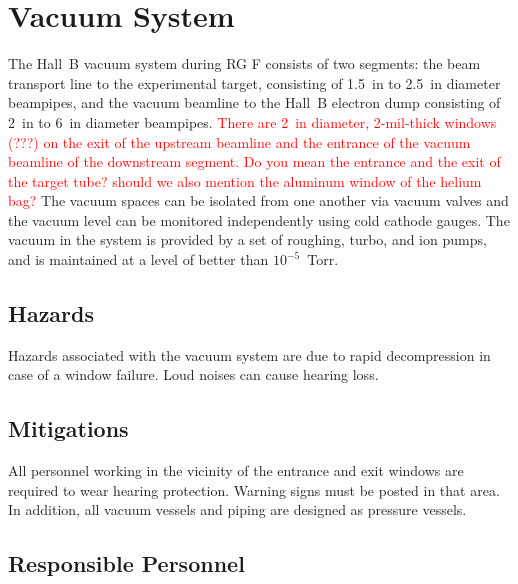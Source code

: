 \section{Vacuum System}

The Hall~B vacuum system during RG F consists of %
two segments: the beam transport line to the 
experimental target, consisting of 1.5~in to 2.5~in diameter beampipes, 
and the vacuum beamline to the Hall~B electron dump consisting of 
2~in to 6~in diameter beampipes. 
\textcolor{red}{There are  2~in diameter, 2-mil-thick windows (???) on the exit 
of the upstream beamline and the entrance of the vacuum beamline of the 
downstream segment. Do you mean the entrance and the exit of the target tube?  
should we also mention the aluminum window of the helium bag?} 
The vacuum spaces can be 
isolated from one another via vacuum valves and the vacuum level can be monitored 
independently using cold cathode gauges. The vacuum in the system is provided by a set of 
roughing, turbo, and ion pumps, and is maintained at a level of better than 
$10^{-5}$~Torr. 

\subsection{Hazards} 

Hazards associated with the vacuum system are due to rapid decompression in case of a window 
failure. Loud noises can cause hearing loss. 

\subsection{Mitigations}

All personnel working in the vicinity of the entrance and exit windows are required to wear 
hearing protection. Warning signs must be posted in that area. In addition, all vacuum vessels 
and piping are designed as pressure vessels.   

\subsection{Responsible Personnel}

